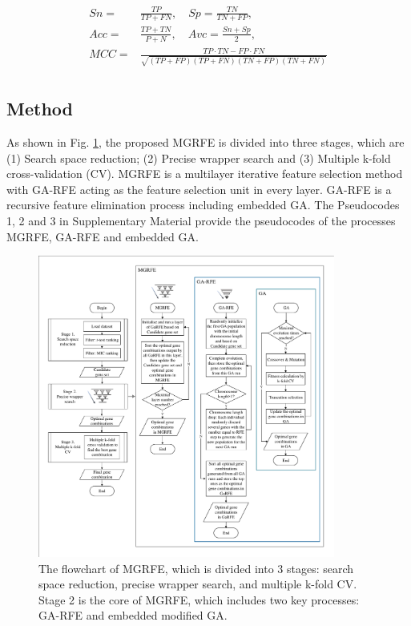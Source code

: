 \documentclass[10pt,journal,compsoc]{IEEEtran}
\begin{document}
	{\scriptsize
		\begin{equation}\label{eq:1}
		\begin{split}
		Sn = & \frac{TP}{TP+FN} ,\quad Sp = \frac{TN}{TN+FP}, \\
		Acc = & \frac{TP+TN}{P+N} ,\quad Avc = \frac{Sn+Sp}{2}, \\
		MCC = & \frac{TP \cdot TN-FP \cdot FN}{\sqrt{(TP+FP)(TP+FN)(TN+FP)(TN+FN)}}\\
		\end{split}
		\end{equation}
	}
	
	\subsection{Method}
	
	As shown in Fig. \ref {Fig:MGRFE_flowchart}, the proposed MGRFE is divided into three stages, which are (1) Search space reduction; (2) Precise wrapper search and (3) Multiple k-fold cross-validation (CV). MGRFE is a multilayer iterative feature selection method with GA-RFE acting as the feature selection unit in every layer. GA-RFE is a recursive feature elimination process including embedded GA. The Pseudocodes 1, 2 and 3 in Supplementary Material provide the pseudocodes of the processes MGRFE, GA-RFE and embedded GA.
	
	\begin{figure}[t]
		\centering
		\includegraphics[width=0.87\textwidth]{pictures/MGRFE-flowchart.pdf}
		\caption{The flowchart of MGRFE, which is divided into 3 stages: search space reduction, precise wrapper search, and multiple k-fold CV. Stage 2 is the core of MGRFE, which includes two key processes: GA-RFE and embedded modified GA.}
		\label{Fig:MGRFE_flowchart}
	\end{figure}
	
\end{document}
